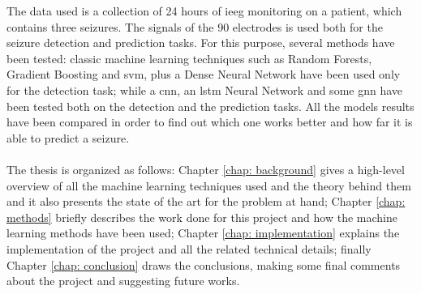 The data used is a collection of 24 hours of \acs{ieeg} monitoring on a patient, which contains three seizures. The signals of the 90 electrodes is used both for the seizure detection and prediction tasks. For this purpose, several methods have been tested: classic machine learning techniques such as Random Forests, Gradient Boosting and \acf{svm}, plus a Dense Neural Network have been used only for the detection task; while a \acf{cnn}, an \acs{lstm} Neural Network and some \acf{gnn} have been tested both on the detection and the prediction tasks. All the models results have been compared in order to find out which one works better and how far it is able to predict a seizure.

\paragraph{} The thesis is organized as follows: Chapter \ref{chap: background} gives a high-level overview of all the machine learning techniques used and the theory behind them and it also presents the state of the art for the problem at hand; Chapter \ref{chap: methods} briefly describes the work done for this project and how the machine learning methods have been used; Chapter \ref{chap: implementation} explains the implementation of the project and all the related technical details; finally Chapter \ref{chap: conclusion} draws the conclusions, making some final comments about the project and suggesting future works.

